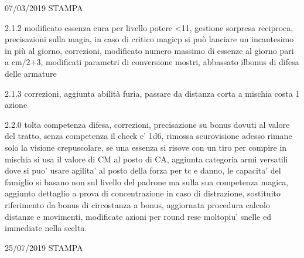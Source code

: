 \documentclass[a4paper,11pt,twoside,openany]{book}
\begin{document}
{{07/03/2019 STAMPA

2.1.2 modificato essenza cura per livello potere \textless11, gestione sorpresa reciproca, precisazioni sulla magia, in caso di critico magicp si può lanciare un incantesimo in più al giorno, correzioni, modificato numero massimo di essenze al giorno pari a cm/2+3, modificati parametri di conversione mostri, abbassato ilbonus di difesa delle armature 

2.1.3 correzioni, aggiunta abilità furia, passare da distanza corta a mischia costa 1 azione

2.2.0 tolta competenza difesa, correzioni, precisazione su bonus dovuti al valore del tratto, senza competenza il check e’ 1d6, rimossa scurovisione adesso rimane solo la visione crepuscolare, se una essenza si risove con un tiro per compire in mischia si usa il valore di CM al posto di CA, aggiunta categoria armi versatili dove si puo’ usare agilita’ al posto della forza per tc e danno, le capacita’ del famiglio si basano non sul livello del padrone ma sulla sua competenza magica, aggiunto dettaglio a prova di concentrazione in caso di distrazione, sostituito riferimento da bonus di circostanza a bonus, aggiornata procedura calcolo distanze e movimenti, modificate azioni per round rese moltopiu’ snelle ed immediate nella scelta.

25/07/2019 STAMPA

}}
\end{document}
